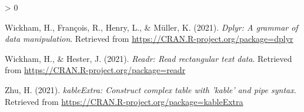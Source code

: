 \documentclass[
  english,
  man]{apa6}
\newlength{\cslhangindent}
\newenvironment{CSLReferences}[2] %
 {%
  \setlength{\parindent}{0pt}
  \ifodd #1 \everypar{\setlength{\hangindent}{\cslhangindent}}\ignorespaces\fi
  \ifnum #2 > 0
  \setlength{\parskip}{#2\baselineskip}
  \fi
 }%
 {}
\begin{document}
\begin{CSLReferences}{1}{0}
\leavevmode\hypertarget{ref-R-dplyr}{}%
Wickham, H., François, R., Henry, L., \& Müller, K. (2021). \emph{Dplyr: A grammar of data manipulation}. Retrieved from \url{https://CRAN.R-project.org/package=dplyr}

\leavevmode\hypertarget{ref-R-readr}{}%
Wickham, H., \& Hester, J. (2021). \emph{Readr: Read rectangular text data}. Retrieved from \url{https://CRAN.R-project.org/package=readr}

\leavevmode\hypertarget{ref-R-kableExtra}{}%
Zhu, H. (2021). \emph{kableExtra: Construct complex table with 'kable' and pipe syntax}. Retrieved from \url{https://CRAN.R-project.org/package=kableExtra}

\end{CSLReferences}

\endgroup
\end{document}
